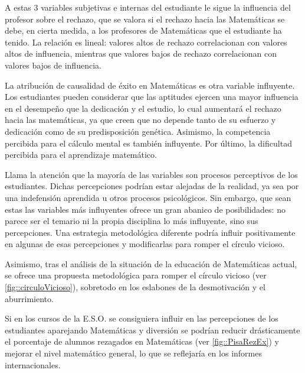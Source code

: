 A estas 3 variables subjetivas e internas del estudiante le sigue la influencia del profesor sobre el rechazo, que se valora si el rechazo hacia las Matemáticas se debe, en cierta medida, a los profesores de Matemáticas que el estudiante ha tenido.
%
La relación es lineal: valores altos de rechazo correlacionan con valores altos de influencia, mientras que valores bajos de rechazo correlacionan con valores bajos de influencia.

La atribución de causalidad de éxito en Matemáticas es otra variable influyente. 
%
Los estudiantes pueden considerar que las aptitudes ejercen una mayor influencia en el desempeño que la dedicación y el estudio, lo cual aumentará el rechazo hacia las matemáticas, ya que creen que no depende tanto de su esfuerzo y dedicación como de su predisposición genética.
%
Asimismo, la competencia percibida para el cálculo mental es también influyente.
%
Por último, la dificultad percibida para el aprendizaje matemático.


Llama la atención que la mayoría de las variables son procesos perceptivos de los estudiantes.
%
Dichas percepciones podrían estar alejadas de la realidad, ya sea por una indefensión aprendida u otros procesos psicológicos.
%
Sin embargo, que sean estas las variables más influyentes ofrece un gran abanico de posibilidades: no parece ser el temario ni la propia disciplina lo más influyente, sino sus percepciones.
%
Una estrategia metodológica diferente podría influir positivamente en algunas de esas percepciones y modificarlas para romper el círculo vicioso.

Asimismo, tras el análisis de la situación de la educación de Matemáticas actual,
%
se ofrece una propuesta metodológica para romper el círculo vicioso (ver \ref{fig::circuloVicioso}), sobretodo en los eslabones de la desmotivación y el aburrimiento.

Si en los cursos de la E.S.O. se consiguiera influir en las percepciones de los estudiantes aparejando Matemáticas y diversión se podrían reducir drásticamente el porcentaje de alumnos rezagados en Matemáticas (ver \ref{fig::PisaRezEx}) y mejorar el nivel matemático general, lo que se reflejaría en los informes internacionales.

